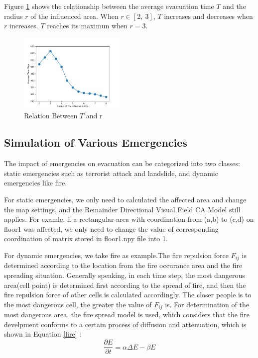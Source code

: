 \documentclass{mcmthesis}
\begin{document}
Figure \ref{tr} shows the relationship between the average evacuation time $T$ and the radius $r$ of the influenced area. When $r\in\left[2,\ 3\right]$, $T$ increases and decreases when $r$ increases. $T$ reaches its maximun when $r=3$.
\begin{figure}[H]
    \centering
    \includegraphics[width=0.45\textwidth]{T-r.png}
    \caption{Relation Between $T$ and r}
    \label{tr}
\end{figure}


    \subsection{Simulation of Various Emergencies}
    The impact of emergencies on evacuation can be categorized into two classes: static emergencies such as terrorist attack and
    landslide, and dynamic emergencies like fire.

    For static emergencies, we only need to calculated the affected area and change the map settings, and the Remainder Directional Visual Field CA Model still applies. For examle, if a rectangular area with coordination from (a,b) to (c,d) on floor1 was affected, we only need to change the value of corresponding coordination of matrix stored in floor1.npy file into 1. 

    For dynamic emergencies, we take fire as example.The fire repulsion force $F_{ij}$ is determined according to the location from the fire occurance area and the fire spreading situation. Generally speaking, in each time step, the most dangerous area(cell point) is determined first according to the spread of fire, and then the fire repulsion force of other cells is calculated accordingly. The closer people is to the most dangerous cell, the greater the value of $F_{ij}$ is. For determination of the most dangerous area, the fire spread model is used, which considers that the fire develpment conforms to a certain process of diffusion and attenuation, which is shown in Equation \eqref{fire} :
    \begin{equation}
        \frac{\partial E}{\partial t} = \alpha \Delta E - \beta E
    \label{fire}    
    \end{equation} 
\end{document}
